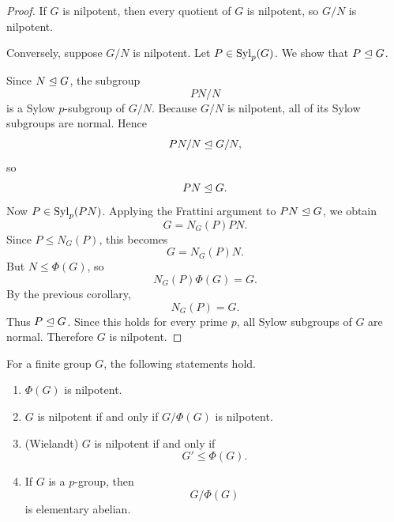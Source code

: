 \begin{proof}
If \(G\) is nilpotent, then every quotient of \(G\) is nilpotent, so \(G/N\) is
nilpotent.

Conversely, suppose \(G/N\) is nilpotent. Let \(P\in \operatorname{Syl}_p(G)\). We show that
\(P\trianglelefteq G\).

Since \(N\trianglelefteq G\), the subgroup
\[
    PN/N
\]
is a Sylow \(p\)-subgroup of \(G/N\). Because \(G/N\) is nilpotent, all of its
Sylow subgroups are normal. Hence
\[
    PN/N\trianglelefteq G/N,
\]
so
\[
    PN\trianglelefteq G.
\]
Now \(P\in \operatorname{Syl}_p(PN)\). Applying the Frattini argument to \(PN\trianglelefteq G\), we
obtain
\[
    G=N_G(P)PN.
\]
Since \(P\leq N_G(P)\), this becomes
\[
    G=N_G(P)N.
\]
But \(N\leq \Phi(G)\), so
\[
    N_G(P)\Phi(G)=G.
\]
By the previous corollary,
\[
    N_G(P)=G.
\]
Thus \(P\trianglelefteq G\). Since this holds for every prime \(p\), all Sylow
subgroups of \(G\) are normal. Therefore \(G\) is nilpotent.
\end{proof}

\begin{corollary}
For a finite group \(G\), the following statements hold.

\begin{enumerate}[label=(\arabic*)]
    \item \(\Phi(G)\) is nilpotent.

    \item \(G\) is nilpotent if and only if \(G/\Phi(G)\) is nilpotent.

    \item \textup{(Wielandt)} \(G\) is nilpotent if and only if
    \[
        G'\leq \Phi(G).
    \]

    \item If \(G\) is a \(p\)-group, then
    \[
        G/\Phi(G)
    \]
    is elementary abelian.
\end{enumerate}
\end{corollary}

